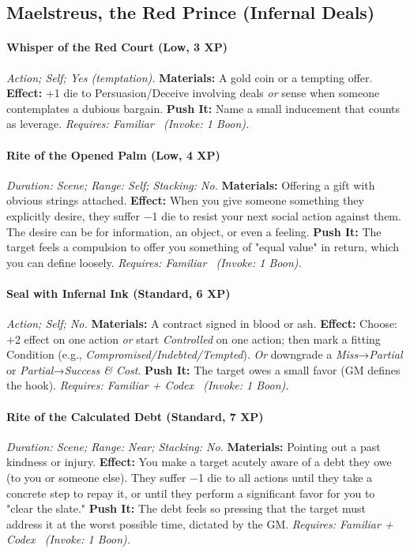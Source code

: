 \documentclass[12pt,twoside]{book}
\begin{document}
\subsection{Maelstreus, the Red Prince (Infernal Deals)}
\paragraph{Whisper of the Red Court (Low, 3 XP)} \emph{Action; Self; Yes (temptation).}
\textbf{Materials:} A gold coin or a tempting offer.
\textbf{Effect:} +1 die to Persuasion/Deceive involving deals \emph{or} sense when someone contemplates a dubious bargain.
\textbf{Push It:} Name a small inducement that counts as leverage.
\emph{Requires: Familiar \ (\textit{Invoke:} 1 Boon).}
\paragraph{Rite of the Opened Palm (Low, 4 XP)} \emph{Duration: Scene; Range: Self; Stacking: No.}
\textbf{Materials:} Offering a gift with obvious strings attached.
\textbf{Effect:} When you give someone something they explicitly desire, they suffer −1 die to resist your next social action against them. The desire can be for information, an object, or even a feeling.
\textbf{Push It:} The target feels a compulsion to offer you something of "equal value" in return, which you can define loosely.
\emph{Requires: Familiar \ (\textit{Invoke:} 1 Boon).}
\paragraph{Seal with Infernal Ink (Standard, 6 XP)} \emph{Action; Self; No.}
\textbf{Materials:} A contract signed in blood or ash.
\textbf{Effect:} Choose: +2 effect on one action \emph{or} start \emph{Controlled} on one action; then mark a fitting Condition (e.g., \emph{Compromised/Indebted/Tempted}). \emph{Or} downgrade a \emph{Miss}→\emph{Partial} or \emph{Partial}→\emph{Success \& Cost}.
\textbf{Push It:} The target owes a small favor (GM defines the hook).
\emph{Requires: Familiar + Codex \ (\textit{Invoke:} 1 Boon).}
\paragraph{Rite of the Calculated Debt (Standard, 7 XP)} \emph{Duration: Scene; Range: Near; Stacking: No.}
\textbf{Materials:} Pointing out a past kindness or injury.
\textbf{Effect:} You make a target acutely aware of a debt they owe (to you or someone else). They suffer −1 die to all actions until they take a concrete step to repay it, or until they perform a significant favor for you to "clear the slate."
\textbf{Push It:} The debt feels so pressing that the target must address it at the worst possible time, dictated by the GM.
\emph{Requires: Familiar + Codex \ (\textit{Invoke:} 1 Boon).}
\end{document}
